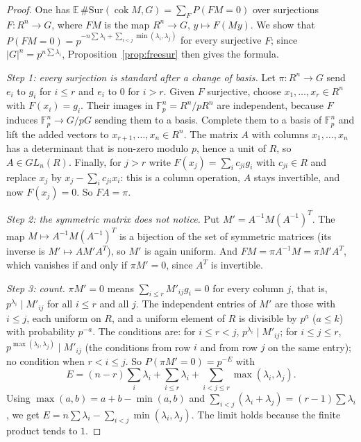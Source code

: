 \begin{proof}
One has $\mathbb E\,\#\mathrm{Sur}(\operatorname{cok}M,G)=\sum_{F}P(FM=0)$ over surjections $F:R^n\to G$, where $FM$ is the map $R^n\to G$, $y\mapsto F(My)$. We show that $P(FM=0)=p^{-n\sum\lambda_i+\sum_{i<j}\min(\lambda_i,\lambda_j)}$ for every surjective $F$; since $|G|^n=p^{n\sum\lambda_i}$, Proposition~\ref{prop:freesur} then gives the formula.

\emph{Step 1: every surjection is standard after a change of basis.} Let $\pi:R^n\to G$ send $e_i$ to $g_i$ for $i\le r$ and $e_i$ to $0$ for $i>r$. Given $F$ surjective, choose $x_1,\dots,x_r\in R^n$ with $F(x_i)=g_i$. Their images in $\mathbb F_p^n=R^n/pR^n$ are independent, because $F$ induces $\mathbb F_p^n\to G/pG$ sending them to a basis. Complete them to a basis of $\mathbb F_p^n$ and lift the added vectors to $x_{r+1},\dots,x_n\in R^n$. The matrix $A$ with columns $x_1,\dots,x_n$ has a determinant that is non-zero modulo $p$, hence a unit of $R$, so $A\in GL_n(R)$. Finally, for $j>r$ write $F(x_j)=\sum_ic_{ji}g_i$ with $c_{ji}\in R$ and replace $x_j$ by $x_j-\sum_ic_{ji}x_i$: this is a column operation, $A$ stays invertible, and now $F(x_j)=0$. So $FA=\pi$.

\emph{Step 2: the symmetric matrix does not notice.} Put $M'=A^{-1}M(A^{-1})^{T}$. The map $M\mapsto A^{-1}M(A^{-1})^T$ is a bijection of the set of symmetric matrices (its inverse is $M'\mapsto AM'A^T$), so $M'$ is again uniform. And $FM=\pi A^{-1}M=\pi M'A^T$, which vanishes if and only if $\pi M'=0$, since $A^T$ is invertible.

\emph{Step 3: count.} $\pi M'=0$ means $\sum_{i\le r}M'_{ij}g_i=0$ for every column $j$, that is, $p^{\lambda_i}\mid M'_{ij}$ for all $i\le r$ and all $j$. The independent entries of $M'$ are those with $i\le j$, each uniform on $R$, and a uniform element of $R$ is divisible by $p^a$ ($a\le k$) with probability $p^{-a}$. The conditions are: for $i\le r<j$, $p^{\lambda_i}\mid M'_{ij}$; for $i\le j\le r$, $p^{\max(\lambda_i,\lambda_j)}\mid M'_{ij}$ (the conditions from row $i$ and from row $j$ on the same entry); no condition when $r<i\le j$. So $P(\pi M'=0)=p^{-E}$ with
\[
E=(n-r)\sum_i\lambda_i+\sum_{i\le r}\lambda_i+\sum_{i<j\le r}\max(\lambda_i,\lambda_j).
\]
Using $\max(a,b)=a+b-\min(a,b)$ and $\sum_{i<j}(\lambda_i+\lambda_j)=(r-1)\sum\lambda_i$, we get $E=n\sum\lambda_i-\sum_{i<j}\min(\lambda_i,\lambda_j)$. The limit holds because the finite product tends to $1$.
\end{proof}

